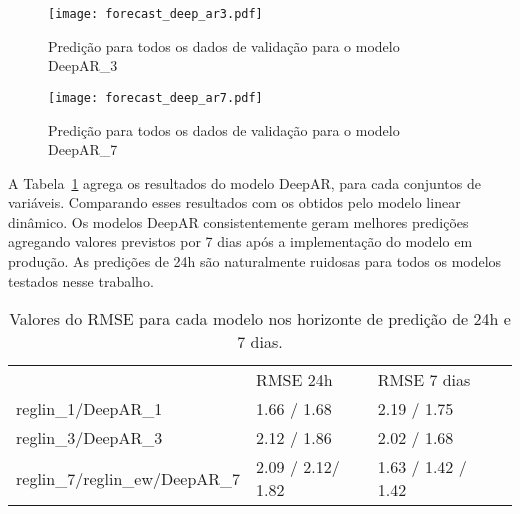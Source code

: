 \begin{figure}[H]
  \centering
  \texttt{[image: forecast\_deep\_ar3.pdf]} 
  \caption{Predição para todos os dados de validação para o modelo DeepAR\_3}
  \label{fig:fordeepar3}
\end{figure}

\begin{figure}[H]
  \centering
  \texttt{[image: forecast\_deep\_ar7.pdf]} 
  \caption{Predição para todos os dados de validação para o modelo DeepAR\_7}
  \label{fig:fordeepar7}
\end{figure}


A Tabela~\ref{tb:rmsedeepar} agrega os resultados do modelo DeepAR, para cada
conjuntos de variáveis. Comparando esses resultados com os obtidos pelo modelo
linear dinâmico. Os modelos DeepAR consistentemente geram melhores predições agregando valores previstos por 7 dias
após a implementação do modelo em produção. As predições de 24h são naturalmente
ruidosas para todos os modelos testados nesse trabalho.

\begin{center}
\begin{table}[]
  \centering
  \begin{tabular}{l|lll}
    \cline{2-3}
    & \multicolumn{1}{l|}{RMSE 24h} & \multicolumn{1}{l|}{RMSE 7 dias} &  \\ \cline{1-3}
    \multicolumn{1}{|l|}{reglin\_1/DeepAR\_1} & 1.66 / 1.68                   & 2.19 / 1.75                      &  \\ \cline{1-1}
    \multicolumn{1}{|l|}{reglin\_3/DeepAR\_3} & 2.12 / 1.86                   & 2.02 / 1.68                      &  \\ \cline{1-1}
    \multicolumn{1}{|l|}{reglin\_7/reglin\_ew/DeepAR\_7} & 2.09 / 2.12/ 1.82                   & 1.63 / 1.42 / 1.42                      &  \\ \cline{1-1}
  \end{tabular}
  \caption{Valores do RMSE para cada modelo nos horizonte de predição de 24h e 7 dias.}
\label{tb:rmsedeepar}
\end{table}
\end{center}
